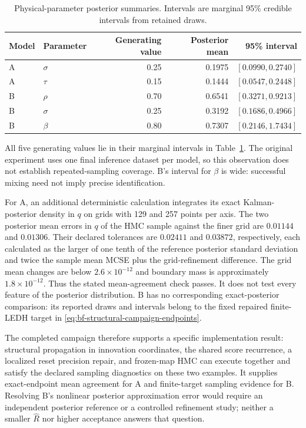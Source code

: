 \begin{table}[htbp]
\centering\small
\caption{Physical-parameter posterior summaries.  Intervals are marginal
95\% credible intervals from retained draws.}
\label{tab:bf-structural-ab-posterior}
\begin{tabular}{llrrr}
\toprule
Model & Parameter & Generating value & Posterior mean & 95\% interval\\
\midrule
A & $\sigma$ & 0.25 & 0.1975 & $[0.0990,0.2740]$\\
A & $\tau$ & 0.15 & 0.1444 & $[0.0547,0.2448]$\\
B & $\rho$ & 0.70 & 0.6541 & $[0.3271,0.9213]$\\
B & $\sigma$ & 0.25 & 0.3192 & $[0.1686,0.4966]$\\
B & $\beta$ & 0.80 & 0.7307 & $[0.2146,1.7434]$\\
\bottomrule
\end{tabular}
\end{table}

All five generating values lie in their marginal intervals in
Table~\ref{tab:bf-structural-ab-posterior}.  The original experiment uses one final inference dataset per model, so this
observation does not establish repeated-sampling coverage.  B's interval for $\beta$ is wide: successful mixing need not imply
precise identification.

For A, an additional deterministic calculation integrates its exact
Kalman-posterior density in $q$ on grids with 129 and 257 points per axis.
The two posterior mean errors in $q$ of the HMC sample against the finer grid are
$0.01144$ and $0.01306$.  Their declared tolerances are $0.02411$ and
$0.03872$, respectively, each calculated as the larger of one tenth of the
reference posterior standard deviation and twice the sample mean MCSE plus
the grid-refinement difference.  The grid mean changes are below
$2.6\times10^{-12}$ and boundary mass is approximately $1.8\times10^{-12}$.
Thus the stated mean-agreement check passes.  It does not test every feature
of the posterior distribution.  B has no corresponding exact-posterior
comparison: its reported draws and intervals belong to the fixed repaired
finite-LEDH target in \eqref{eq:bf-structural-campaign-endpoints}.

The completed campaign therefore supports a specific implementation result:
structural propagation in innovation coordinates, the shared score recurrence, a
localized reset precision repair, and frozen-map HMC can execute together
and satisfy the declared sampling diagnostics on these two examples.
It supplies exact-endpoint mean agreement for A and finite-target sampling
evidence for B.  Resolving B's nonlinear posterior approximation error would
require an independent posterior reference or a controlled refinement study;
neither a smaller $\widehat R$ nor higher acceptance answers that question.

